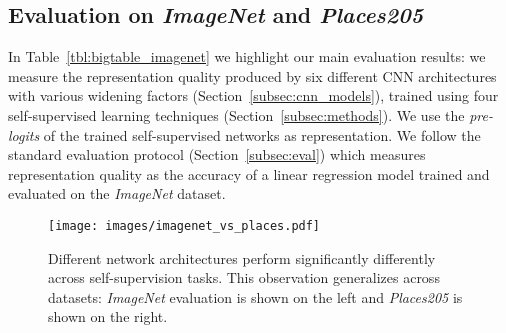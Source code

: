 \documentclass[10pt,twocolumn,letterpaper]{article}
\begin{document}
\subsection{Evaluation on \emph{ImageNet} and \emph{Places205}}\label{subsec:bigtable}

In Table~\ref{tbl:bigtable_imagenet} we highlight our main evaluation results:
we measure the representation quality produced by six different CNN architectures with various widening factors (Section~\ref{subsec:cnn_models}), trained using four self-supervised learning techniques (Section~\ref{subsec:methods}).
We use the \emph{pre-logits} of the trained self-supervised networks as representation.
We follow the standard evaluation protocol (Section~\ref{subsec:eval}) which measures representation quality as the accuracy of a linear regression model trained and evaluated on the \emph{ImageNet} dataset.


\begin{figure}[b]
  \begin{center}
    \texttt{[image: images/imagenet\_vs\_places.pdf]}
  \end{center}
  \caption{
     Different network architectures perform significantly differently across self-supervision tasks. This observation generalizes across datasets: \emph{ImageNet} evaluation is shown on the left and \emph{Places205} is shown on the right.
  }\label{fig:imagenet_vs_places}
\end{figure}
\end{document}
